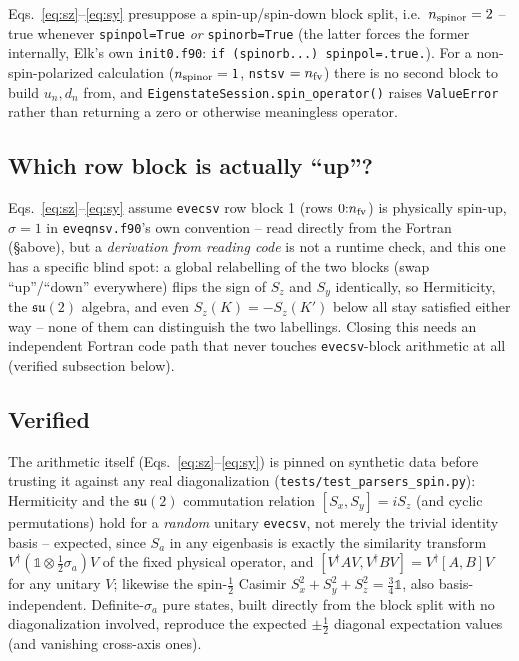 \documentclass[11pt]{article}
\begin{document}
Eqs.~\eqref{eq:sz}--\eqref{eq:sy} presuppose a spin-up/spin-down block split, i.e.\
$n_{\rm spinor}=2$ -- true whenever \texttt{spinpol=True} \emph{or} \texttt{spinorb=True} (the
latter forces the former internally, Elk's own \texttt{init0.f90}: \texttt{if (spinorb...)
spinpol=.true.}). For a non-spin-polarized calculation ($n_{\rm spinor}=1$, \texttt{nstsv}
$=n_{\rm fv}$) there is no second block to build $u_n,d_n$ from, and
\texttt{EigenstateSession.spin\_operator()} raises \texttt{ValueError} rather than returning a
zero or otherwise meaningless operator.

\subsection{Which row block is actually ``up''?}

Eqs.~\eqref{eq:sz}--\eqref{eq:sy} assume \texttt{evecsv} row block 1 (rows $0{:}n_{\rm fv}$)
is physically spin-up, $\sigma=1$ in \texttt{eveqnsv.f90}'s own convention -- read directly
from the Fortran (\S above), but a \emph{derivation from reading code} is not a runtime
check, and this one has a specific blind spot: a global relabelling of the two blocks (swap
``up''/``down'' everywhere) flips the sign of $S_z$ and $S_y$ identically, so Hermiticity,
the $\mathfrak{su}(2)$ algebra, and even $S_z(K)=-S_z(K')$ below all stay satisfied either
way -- none of them can distinguish the two labellings. Closing this needs an independent
Fortran code path that never touches \texttt{evecsv}-block arithmetic at all (verified
subsection below).

\subsection{Verified}

The arithmetic itself (Eqs.~\eqref{eq:sz}--\eqref{eq:sy}) is pinned on synthetic data before
trusting it against any real diagonalization
(\texttt{tests/test\_parsers\_spin.py}): Hermiticity and the $\mathfrak{su}(2)$ commutation
relation $[S_x,S_y]=iS_z$ (and cyclic permutations) hold for a \emph{random} unitary
\texttt{evecsv}, not merely the trivial identity basis -- expected, since $S_a$ in any
eigenbasis is exactly the similarity transform $V^\dagger(\mathbb
1\otimes\tfrac12\sigma_a)V$ of the fixed physical operator, and $[V^\dagger A V, V^\dagger B
V]=V^\dagger[A,B]V$ for any unitary $V$; likewise the spin-$\tfrac12$ Casimir
$S_x^2+S_y^2+S_z^2=\tfrac34\mathbb 1$, also basis-independent. Definite-$\sigma_a$ pure
states, built directly from the block split with no diagonalization involved, reproduce the
expected $\pm\tfrac12$ diagonal expectation values (and vanishing cross-axis ones).
\end{document}
